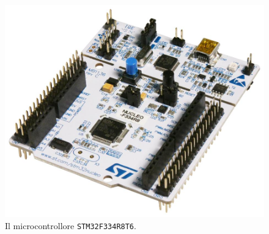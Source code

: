 \documentclass[a4paper]{article}
\begin{document}
\begin{figure}
\begin{center}
    \includegraphics[scale=0.20]{figures/stm32f334.jpg}
\end{center}
\caption{Il microcontrollore \texttt{STM32F334R8T6}.}
\label{fig:stm32f334}
\end{figure}
\end{document}
